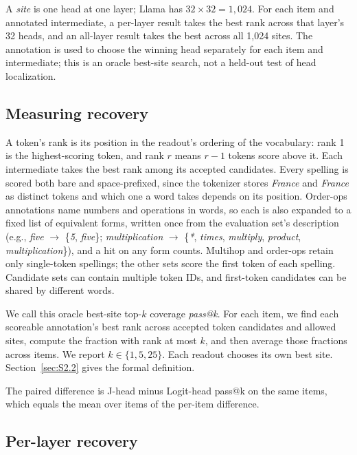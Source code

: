 \documentclass[11pt,a4paper]{article}
\begin{document}
A \emph{site} is one head at one layer; Llama has $32\times 32=1{,}024$. For each item and annotated intermediate, a per-layer result takes the best rank across that layer's 32 heads, and an all-layer result takes the best across all 1,024 sites. The annotation is used to choose the winning head separately for each item and intermediate; this is an oracle best-site search, not a held-out test of head localization.

\subsection{Measuring recovery}\label{sec:3.3}

A token's rank is its position in the readout's ordering of the vocabulary: rank 1 is the highest-scoring token, and rank $r$ means $r-1$ tokens score above it. Each intermediate takes the best rank among its accepted candidates. Every spelling is scored both bare and space-prefixed, since the tokenizer stores \emph{France} and \emph{\textvisiblespace France} as distinct tokens and which one a word takes depends on its position. Order-ops annotations name numbers and operations in words, so each is also expanded to a fixed list of equivalent forms, written once from the evaluation set's description (e.g., \emph{five} $\to$ \{\emph{5}, \emph{five}\}; \emph{multiplication} $\to$ \{\emph{*}, \emph{times}, \emph{multiply}, \emph{product}, \emph{multiplication}\}), and a hit on any form counts. Multihop and order-ops retain only single-token spellings; the other sets score the first token of each spelling. Candidate sets can contain multiple token IDs, and first-token candidates can be shared by different words.

We call this oracle best-site top-$k$ coverage \emph{pass@k}. For each item, we find each scoreable annotation's best rank across accepted token candidates and allowed sites, compute the fraction with rank at most $k$, and then average those fractions across items. We report $k\in\{1,5,25\}$. Each readout chooses its own best site. Section~\ref{sec:S2.2} gives the formal definition.

The paired difference is J-head minus Logit-head pass@k on the same items, which equals the mean over items of the per-item difference.

\subsection{Per-layer recovery}\label{sec:3.4}
\end{document}
